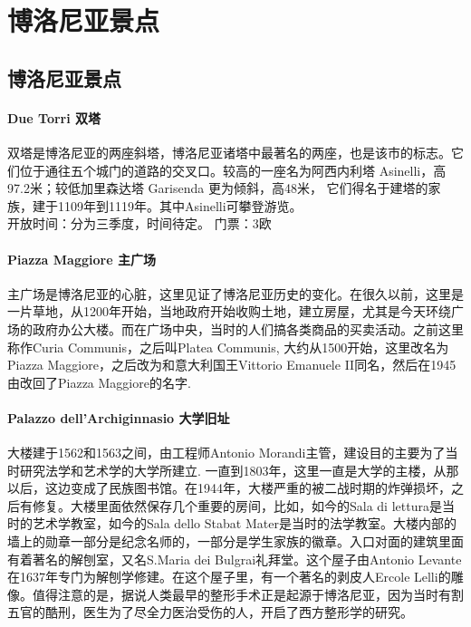 \chapter{博洛尼亚景点}              


\section{博洛尼亚景点}

\subsubsection{Due Torri 双塔}
双塔是博洛尼亚的两座斜塔，博洛尼亚诸塔中最著名的两座，也是该市的标志。它们位于通往五个城门的道路的交叉口。较高的一座名为阿西内利塔 Asinelli，高97.2米；较低加里森达塔 Garisenda 更为倾斜，高48米， 它们得名于建塔的家族，建于1109年到1119年。其中Asinelli可攀登游览。\\
开放时间：分为三季度，时间待定。 门票：3欧


\subsubsection{Piazza Maggiore 主广场}
主广场是博洛尼亚的心脏，这里见证了博洛尼亚历史的变化。在很久以前，这里是一片草地，从1200年开始，当地政府开始收购土地，建立房屋，尤其是今天环绕广场的政府办公大楼。而在广场中央，当时的人们搞各类商品的买卖活动。之前这里称作Curia Communis，之后叫Platea Communis, 大约从1500开始，这里改名为Piazza Maggiore，之后改为和意大利国王Vittorio Emanuele II同名，然后在1945由改回了Piazza Maggiore的名字.
 
\subsubsection{Palazzo dell'Archiginnasio 大学旧址}
大楼建于1562和1563之间，由工程师Antonio Morandi主管，建设目的主要为了当时研究法学和艺术学的大学所建立. 一直到1803年，这里一直是大学的主楼，从那以后，这边变成了民族图书馆。在1944年，大楼严重的被二战时期的炸弹损坏，之后有修复。大楼里面依然保存几个重要的房间，比如，如今的Sala di lettura是当时的艺术学教室，如今的Sala dello Stabat Mater是当时的法学教室。大楼内部的墙上的勋章一部分是纪念名师的，一部分是学生家族的徽章。入口对面的建筑里面有着著名的解刨室，又名S.Maria dei Bulgrai礼拜堂。这个屋子由Antonio Levante在1637年专门为解刨学修建。在这个屋子里，有一个著名的剥皮人Ercole Lelli的雕像。值得注意的是，据说人类最早的整形手术正是起源于博洛尼亚，因为当时有割五官的酷刑，医生为了尽全力医治受伤的人，开启了西方整形学的研究。


